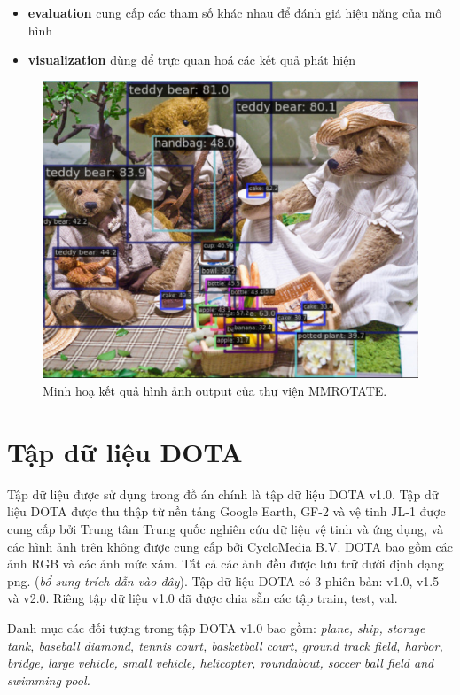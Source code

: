 \documentclass[12pt,a4paper,openany,oneside]{report}
\begin{document}
\begin{itemize}
\begin{itemize}
	\end{itemize}
	\item \textbf{evaluation} cung cấp các tham số khác nhau để đánh giá hiệu năng của mô hình
	\item \textbf{visualization} dùng để trực quan hoá các kết quả phát hiện
	
	
\end{itemize}

\begin{figure}[ht!]
	\begin{center}
		\includegraphics[width=445px]{./demo_mmrotate_result.jpg}
		\caption{Minh hoạ kết quả hình ảnh output của thư viện MMROTATE.}
		\label{demo_mmrotate_result}
	\end{center}
\end{figure} 

\section{Tập dữ liệu DOTA} 

Tập dữ liệu được sử dụng trong đồ án chính là tập dữ liệu DOTA v1.0. Tập dữ liệu DOTA được thu thập từ nền tảng Google Earth, GF-2 và vệ tinh JL-1 được cung cấp bởi Trung tâm Trung quốc nghiên cứu dữ liệu vệ tinh và ứng dụng, và các hình ảnh trên không được cung cấp bởi CycloMedia B.V. DOTA bao gồm các ảnh RGB và các ảnh mức xám. Tất cả các ảnh đều được lưu trữ dưới định dạng png. (\textit{bổ sung trích dẫn vào đây}). Tập dữ liệu DOTA có 3 phiên bản: v1.0, v1.5 và v2.0. Riêng tập dữ liệu v1.0 đã được chia sẵn các tập train, test, val.

Danh mục các đối tượng trong tập DOTA v1.0 bao gồm: \textit{plane, ship, storage tank, baseball diamond, tennis court, basketball court, ground track field, harbor, bridge, large vehicle, small vehicle, helicopter, roundabout, soccer ball field and swimming pool.}
\end{document}
